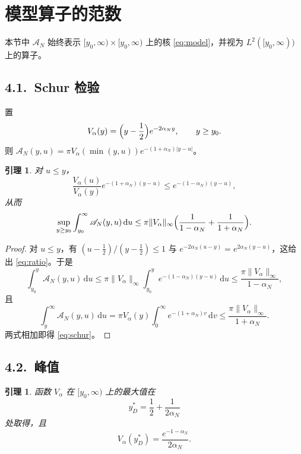 \documentclass[12pt,a4paper]{amsart}
\numberwithin{equation}{section}
\theoremstyle{plain}
\newtheorem{lemma}[theorem]{引理}
\theoremstyle{definition}
\newcommand{\dd}{\,\mathrm{d}}
\begin{document}
\section{模型算子的范数}\label{sec:model}

本节中 $\mathscr A_N$ 始终表示 $[y_0,\infty)\times[y_0,\infty)$ 上的核
\eqref{eq:model}，并视为 $L^2([y_0,\infty))$ 上的算子。

\subsection*{4.1.\ Schur 检验}

置
\begin{equation}\label{eq:Valpha}
 V_\alpha(y)=\Bigl(y-\frac12\Bigr)e^{-2\alpha_Ny},\qquad y\ge y_0 .
\end{equation}
则 $\mathscr A_N(y,u)=\pi V_\alpha(\min(y,u))e^{-(1+\alpha_N)|y-u|}$。

\begin{lemma}\label{lem:schur}
对 $u\le y$，
\begin{equation}\label{eq:ratio}
 \frac{V_\alpha(u)}{V_\alpha(y)}e^{-(1+\alpha_N)(y-u)}
 \le e^{-(1-\alpha_N)(y-u)},
\end{equation}
从而
\begin{equation}\label{eq:schur}
 \sup_{y\ge y_0}\int_{y_0}^{\infty}\mathscr A_N(y,u)\dd u
 \le\pi\|V_\alpha\|_\infty
 \Bigl(\frac1{1-\alpha_N}+\frac1{1+\alpha_N}\Bigr).
\end{equation}
\end{lemma}

\begin{proof}
对 $u\le y$，有 $(u-\frac12)/(y-\frac12)\le1$ 与
$e^{-2\alpha_N(u-y)}=e^{2\alpha_N(y-u)}$，这给出 \eqref{eq:ratio}。于是
\[
 \int_{y_0}^{y}\mathscr A_N(y,u)\dd u
 \le\pi\|V_\alpha\|_\infty\int_{y_0}^{y}e^{-(1-\alpha_N)(y-u)}\dd u
 \le\frac{\pi\|V_\alpha\|_\infty}{1-\alpha_N},
\]
且
\[
 \int_{y}^{\infty}\mathscr A_N(y,u)\dd u
 =\pi V_\alpha(y)\int_0^{\infty}e^{-(1+\alpha_N)v}\dd v
 \le\frac{\pi\|V_\alpha\|_\infty}{1+\alpha_N}.
\]
两式相加即得 \eqref{eq:schur}。
\end{proof}

\subsection*{4.2.\ 峰值}

\begin{lemma}\label{lem:peak}
函数 $V_\alpha$ 在 $[y_0,\infty)$ 上的最大值在
\begin{equation}\label{eq:ystar}
 y_D^*=\frac12+\frac1{2\alpha_N}
\end{equation}
处取得，且
\begin{equation}\label{eq:peak}
 V_\alpha(y_D^*)=\frac{e^{-1-\alpha_N}}{2\alpha_N}.
\end{equation}
\end{lemma}
\end{document}
